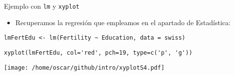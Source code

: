 \documentclass[xcolor={usenames,svgnames,dvipsnames}]{beamer}
\begin{document}
\begin{frame}[fragile,label=sec-3-3-3]{Ejemplo con \texttt{lm} y \texttt{xyplot}}
 \begin{itemize}
\item Recuperamos la regresión que empleamos en el apartado de Estadística:
\end{itemize}
\lstset{language=R,numbers=none}
\begin{lstlisting}
lmFertEdu <- lm(Fertility ~ Education, data = swiss)
\end{lstlisting}

\lstset{language=R,numbers=none}
\begin{lstlisting}
xyplot(lmFertEdu, col='red', pch=19, type=c('p', 'g'))
\end{lstlisting}

\texttt{[image: /home/oscar/github/intro/xyplotS4.pdf]}
\end{frame}
\end{document}
